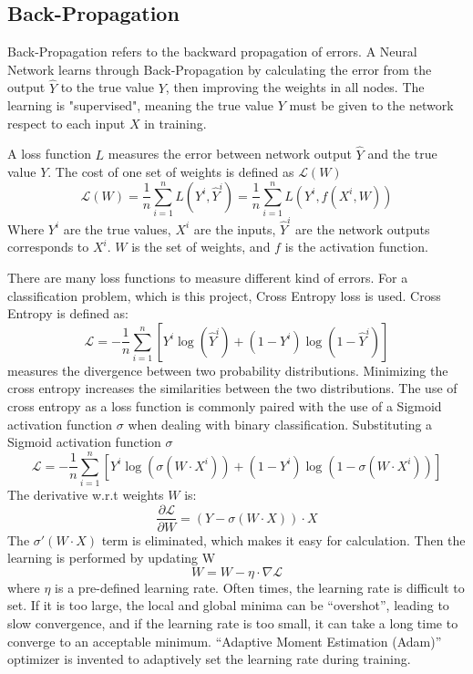 \subsection{Back-Propagation}
Back-Propagation refers to the backward propagation of errors. A Neural Network learns through Back-Propagation by calculating the error from the output $\hat{Y}$ to the true value $Y$, then improving the weights in all nodes. The learning is "supervised", meaning the true value $Y$ must be given to the network respect to each input $X$ in training.

A loss function $L$ measures the error between network output $\hat{Y}$ and the true value $Y$. The cost of one set of weights is defined as $\mathcal{L}(W)$
$$\mathcal{L}(W)= \frac{\mathrm{1}}{n}\sum_{i=1}^{n} L(Y^i,\hat{Y}^i) = \frac{\mathrm{1}}{n}\sum_{i=1}^{n} L(Y^i,f(X^i,W))$$
Where $Y^i$ are the true values, $X^i$ are the inputs, $\hat{Y}^i$ are the network outputs corresponds to $X^i$. $W$ is the set of weights, and $f$ is the activation function.

There are many loss functions to measure different kind of errors. For a classification problem, which is this project, Cross Entropy loss is used. Cross Entropy is defined as:
$$\mathcal{L}=-\frac{\mathrm{1}}{n}\sum_{i=1}^{n}[Y^i \log(\hat{Y}^i)+(1-Y^i) \log(1-\hat{Y}^i)]$$
measures the divergence between two probability distributions. Minimizing the cross entropy increases the similarities between the two distributions. The use of cross entropy as a loss function is commonly paired with the use of a Sigmoid activation function $\sigma$ when dealing with binary classification. Substituting a Sigmoid activation function $\sigma$
$$\mathcal{L}=-\frac{\mathrm{1}}{n}\sum_{i=1}^{n}[Y^i \log(\sigma(W \cdot X^i))+(1-Y^i) \log(1-\sigma(W \cdot X^i))]$$
The derivative w.r.t weights $W$ is:
$$\frac{\partial \mathcal{L}}{\partial W} = (Y - \sigma(W \cdot X))\cdot X$$
The $\sigma'(W \cdot X)$ term is eliminated, which makes it easy for calculation.
Then the learning is performed by updating W
$$ W = W - \eta\cdot\nabla\mathcal{L}$$
where $\eta$ is a pre-defined learning rate. Often times, the learning rate is difficult to set. If it is too large, the local and global minima can be “overshot”, leading to slow convergence, and if the learning rate is too small, it can take a long time to converge to an acceptable minimum. “Adaptive Moment Estimation (Adam)” optimizer is invented to adaptively set the learning rate during training.


